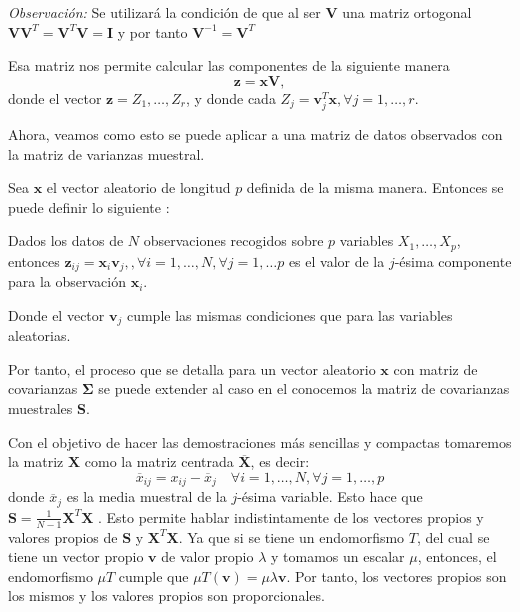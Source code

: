 \noindent \emph{Observación: }Se utilizará la condición de que al ser $\mathbf{V}$ una matriz ortogonal $\mathbf{VV}^T=\mathbf{V}^T\mathbf{V}=\mathbf{I}$ y por tanto $\mathbf{V}^{-1}=\mathbf{V}^T$

\noindent Esa matriz nos permite calcular las componentes de la siguiente manera
\begin{equation}
\mathbf{z}=\mathbf{x} \mathbf{V},
\end{equation} 
\noindent donde el vector $\mathbf{z}=Z_1,\ldots, Z_r$, y donde cada $Z_j=\mathbf{v}_j^T\mathbf{x}, \forall j=1,\ldots, r$.

\noindent Ahora, veamos como esto se puede aplicar a una matriz de datos observados con la matriz de varianzas muestral.

\noindent Sea $\mathbf{x}$ el vector aleatorio de longitud $p$ definida de la misma manera. Entonces se puede definir lo siguiente :

\begin{defi}
Dados los datos de $N$ observaciones recogidos sobre $p$ variables $X_1,\ldots, X_p$, entonces $\mathbf{z}_{ij}=\mathbf{x}_i\mathbf{v}_j, ,\forall i=1,\ldots, N,\forall j=1,\ldots p$ es el valor de la $j$-ésima componente para la observación $\mathbf{x}_i$. 

\noindent Donde el vector $\mathbf{v}_j$ cumple las mismas condiciones que para las variables aleatorias. 
\end{defi}

\noindent Por tanto, el proceso que se detalla para un vector aleatorio $\mathbf{x}$ con matriz de covarianzas $\mathbf{\Sigma}$ se puede extender al caso en el conocemos la matriz de covarianzas muestrales \textbf{S}.

\noindent Con el objetivo de hacer las demostraciones más sencillas y compactas tomaremos la matriz $\textbf{X}$ como la matriz centrada $\overline{\textbf{X}}$, es decir: 
\begin{equation}
\overline{x}_{ij}=x_{ij}-\overline{x}_j \quad \forall i=1,\ldots,N,\forall j=1,\ldots,p
\end{equation}
donde $\overline{x}_j$ es la media muestral de la $j$-ésima variable. Esto hace que $\textbf{S}=\frac{1}{N-1}\textbf{X}^T\textbf{X}$ \cite{Peña 2002}. Esto permite hablar indistintamente de los vectores propios y valores propios de $\mathbf{S}$ y $\mathbf{X}^T\mathbf{X}$. Ya que si se tiene un endomorfismo $T$, del cual se tiene un vector propio $\mathbf{v}$ de valor propio $\lambda$ y tomamos un escalar $\mu$, entonces, el endomorfismo $\mu T$ cumple que $\mu T(\mathbf{v})=\mu \lambda \mathbf{v}$. Por tanto, los vectores propios son los mismos y los valores propios son proporcionales. 

